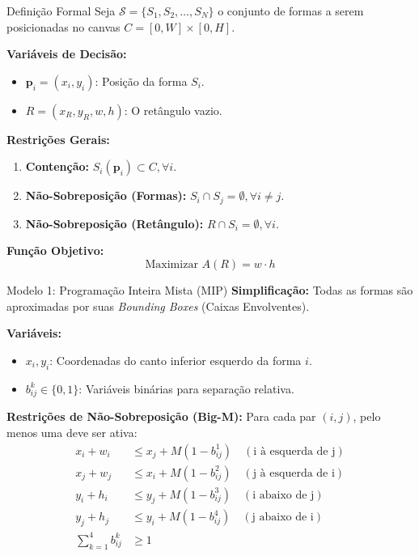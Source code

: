 \documentclass{beamer}
\begin{document}
\begin{frame}{Definição Formal}
    Seja $\mathcal{S} = \{S_1, S_2, \dots, S_N\}$ o conjunto de formas a serem posicionadas no canvas $C = [0, W] \times [0, H]$.
    
    \vspace{0.3cm}
    \textbf{Variáveis de Decisão:}
    \begin{itemize}
        \item $\mathbf{p}_i = (x_i, y_i)$: Posição da forma $S_i$.
        \item $R = (x_R, y_R, w, h)$: O retângulo vazio.
    \end{itemize}

    \vspace{0.3cm}
    \textbf{Restrições Gerais:}
    \begin{enumerate}
        \item \textbf{Contenção:} $S_i(\mathbf{p}_i) \subset C, \forall i$.
        \item \textbf{Não-Sobreposição (Formas):} $S_i \cap S_j = \emptyset, \forall i \neq j$.
        \item \textbf{Não-Sobreposição (Retângulo):} $R \cap S_i = \emptyset, \forall i$.
    \end{enumerate}

    \vspace{0.3cm}
    \textbf{Função Objetivo:}
    \[ \text{Maximizar } A(R) = w \cdot h \]
\end{frame}

\begin{frame}{Modelo 1: Programação Inteira Mista (MIP)}
    \textbf{Simplificação:} Todas as formas são aproximadas por suas \textit{Bounding Boxes} (Caixas Envolventes).
    
    \vspace{0.3cm}
    \textbf{Variáveis:}
    \begin{itemize}
        \item $x_i, y_i$: Coordenadas do canto inferior esquerdo da forma $i$.
        \item $b_{ij}^k \in \{0, 1\}$: Variáveis binárias para separação relativa.
    \end{itemize}

    \vspace{0.3cm}
    \textbf{Restrições de Não-Sobreposição (Big-M):}
    Para cada par $(i, j)$, pelo menos uma deve ser ativa:
    \begin{align*}
        x_i + w_i &\le x_j + M(1 - b_{ij}^1) \quad (\text{i à esquerda de j}) \\
        x_j + w_j &\le x_i + M(1 - b_{ij}^2) \quad (\text{j à esquerda de i}) \\
        y_i + h_i &\le y_j + M(1 - b_{ij}^3) \quad (\text{i abaixo de j}) \\
        y_j + h_j &\le y_i + M(1 - b_{ij}^4) \quad (\text{j abaixo de i}) \\
        \sum_{k=1}^4 b_{ij}^k &\ge 1
    \end{align*}
\end{frame}
\end{document}
